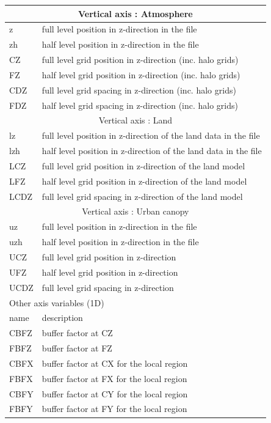 \begin{longtable}{l|l}
\multicolumn{2}{c}{Vertical axis : Atmosphere}\\ \hline
z & full level position in z-direction in the file \\
zh & half level position in z-direction in the file \\
CZ & full level grid position in z-direction (inc. halo grids) \\
FZ & half level grid position in z-direction (inc. halo grids) \\
CDZ & full level grid spacing in z-direction (inc. halo grids) \\
FDZ & half level grid spacing in z-direction (inc. halo grids) \\ \hline
\multicolumn{2}{c}{Vertical axis : Land}\\ \hline
lz & full level position in z-direction of the land data in the file \\
lzh & half level position in z-direction of the land data in the file \\
LCZ & full level grid position in z-direction of the land model \\
LFZ & half level grid position in z-direction of the land model \\
LCDZ & full level grid spacing in z-direction of the land model \\  \hline
\multicolumn{2}{c}{Vertical axis : Urban canopy}\\ \hline
uz & full level position in z-direction in the file \\
uzh & half level position in z-direction in the file \\
UCZ & full level grid position in z-direction \\
UFZ & half level grid position in z-direction \\
UCDZ & full level grid spacing in z-direction \\ \hline
 \hline
  \multicolumn{2}{l}{Other axis variables (1D)}\\ \hline
name & description \\ \hline \hline
CBFZ & buffer factor at CZ \\
FBFZ & buffer factor at FZ \\
CBFX & buffer factor at CX for the local region \\
FBFX & buffer factor at FX for the local region \\
CBFY & buffer factor at CY for the local region \\
FBFY & buffer factor at FY for the local region \\

\end{longtable}
